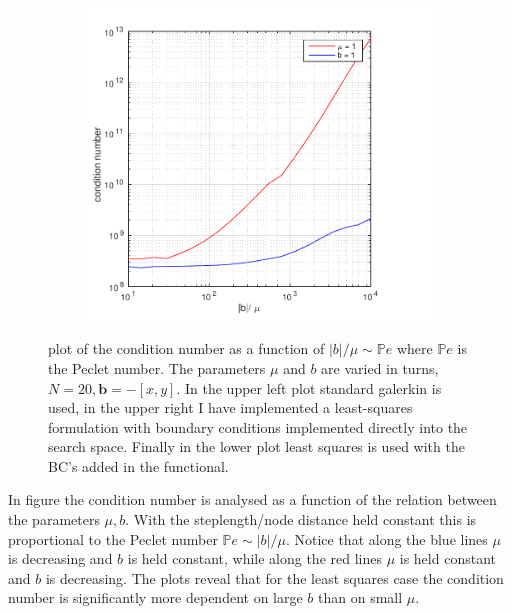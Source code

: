 \begin{figure}[h!]
\begin{subfigure}[b]{0.48\textwidth}
  \end{subfigure}
  \begin{subfigure}[b]{0.48\textwidth}
		\includegraphics[width=\textwidth]{Figures/Spec-LS_difftrans_ConditionNumber_DirFunc.pdf}
  \end{subfigure}
  \vspace{-0.1\baselineskip}
	\caption{plot of the condition number as a function of $|b|/\mu \sim \mathbb{P}e$ where $\mathbb{P}e$ is the Peclet number. The parameters $\mu$ and $b$ are varied in turns, $N=20,\mathbf{b} = -[x,y]$. In the upper left plot standard galerkin is used, in the upper right I have implemented a least-squares formulation with boundary conditions implemented directly into the search space. Finally in the lower plot least squares is used with the BC's added in the functional.}
  \label{fig:CondDifftransSpec}
\end{figure}
%
In figure the condition number is analysed as a function of the relation between the parameters $\mu,b$. With the steplength/node distance held constant this is proportional to the Peclet number $\mathbb{P}e \sim |b|/\mu$. Notice that along the blue lines $\mu$ is decreasing and $b$ is held constant, while along the red lines $\mu$ is held constant and $b$ is decreasing. The plots reveal that for the least squares case the condition number is significantly more dependent on large $b$ than on small $\mu$. 

